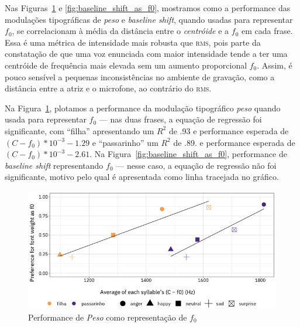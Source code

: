 \documentclass[11pt]{article}
\begin{document}
  Nas Figuras~\ref{fig:font_weight_as_f0} e \ref{fig:baseline_shift_as_f0}, mostramos como a performance das modulações tipográficas de {\itshape peso} e {\itshape baseline shift}, quando usadas para representar $f_0$, se correlacionam à média da distância entre o {\itshape centróide} e a $f_0$ em cada frase. Essa é uma métrica de intensidade mais robusta que \textsc{rms}, pois parte da constatação de que uma voz enunciada com maior intensidade tende a ter uma centróide de frequência mais elevada sem um aumento proporcional $f_0$. Assim, é pouco sensível a pequenas inconsistências no ambiente de gravação, como a distância entre a atriz e o microfone, ao contrário do \textsc{rms}.
  
  Na Figura~\ref{fig:font_weight_as_f0}, plotamos a performance da modulação tipográfico {\itshape peso} quando usada para representar $f_0$ --- nas duas frases, a equação de regressão foi significante, com ``filha'' apresentando um $R^2$ de .93 e performance esperada de $(C-f_0) * 10^{-3} - 1.29$ e ``passarinho'' um $R^2$ de .89. e performance esperada de $(C-f_0) * 10^{-3} - 2.61$. Na Figura~\ref{fig:baseline_shift_as_f0}, performance de {\itshape baseline shift} representando $f_0$ --- nesse caso, a equação de regressão não foi significante, motivo pelo qual é apresentada como linha tracejada no gráfico.
  
\begin{figure}[H]
     {\centering
\includegraphics[width=\linewidth]{fig/font_weight_as_pitch.png}
     \caption{Performance de {\itshape Peso} como representação de $f_0$}
     \label{fig:font_weight_as_f0}\par}
\end{figure}
\end{document}
